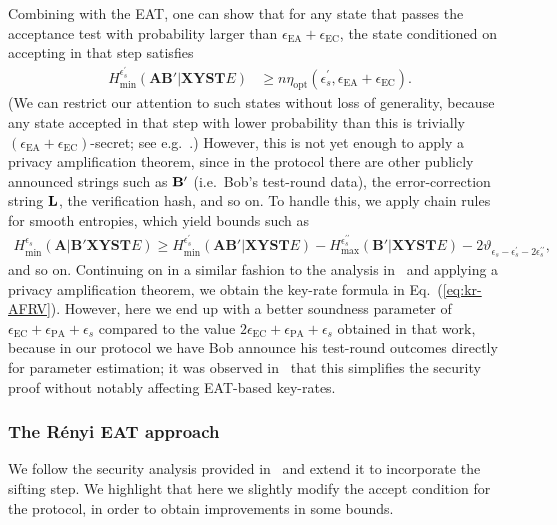 \documentclass[aps,reprint,showpacs,superscriptaddress]{revtex4-2}
\begin{document}
Combining with the EAT, one can show that for any state that passes the acceptance test with probability larger than $\epsilon_{\mathrm{EA}}+\epsilon_{\mathrm{EC}}$, the state conditioned on accepting in that step satisfies
\begin{align}
H_{\min}^{\epsilon_{s}^{\prime}}\left(\mathbf{AB}'|\mathbf{XYST}E\right) & \geqslant n\eta_{\mathrm{opt}}\left(\epsilon_{s}^{\prime},\epsilon_{\mathrm{EA}}+\epsilon_{\mathrm{EC}}\right).
\end{align}
(We can restrict our attention to such states without loss of generality, because any state accepted in that step with lower probability than this is trivially $(\epsilon_{\mathrm{EA}}+\epsilon_{\mathrm{EC}})$-secret; see e.g.~\cite{arnon2018practical,TSB+22}.)
However, this is not yet enough to apply a privacy amplification theorem, since in the protocol there are other publicly announced strings such as $\bf{B}'$ (i.e.~Bob's test-round data), the error-correction string $\bf{L}$, the verification hash, and so on. To handle this, we apply chain rules~\cite{vitanov2013} for smooth entropies, which yield bounds such as
\begin{align}
H_{\min}^{\epsilon_{s}}\left(\mathbf{A}|\mathbf{B}'\mathbf{XYST}E\right)
\geqslant
H_{\min}^{\epsilon_{s}^{\prime}}\left(\mathbf{AB}'|\mathbf{XYST}E\right) - H_{\max}^{\epsilon_{s}^{\prime\prime}}\left(\mathbf{B}'|\mathbf{XYST}E\right)
-2\vartheta_{\epsilon_{s}-\epsilon_{s}^{\prime}-2\epsilon_{s}^{\prime\prime}},
\end{align}
and so on. Continuing on in a similar fashion to the analysis in~\cite{TSB+22} and applying a privacy amplification theorem,
we obtain the key-rate formula in
Eq.~(\ref{eq:kr-AFRV}). However, here we end up with a better soundness parameter of $\epsilon_{\mathrm{EC}}+\epsilon_{\mathrm{PA}}+\epsilon_{s}$ compared to the value $2\epsilon_{\mathrm{EC}}+\epsilon_{\mathrm{PA}}+\epsilon_{s}$ obtained in that work, because in our protocol we have Bob announce his test-round outcomes directly for parameter estimation; it was observed in~\cite{arq2024generalized} that this simplifies the security proof without notably affecting EAT-based key-rates.


\subsubsection{The R\'{e}nyi EAT approach}
We follow the security analysis provided in~\cite{hahn2025analytic} and extend it to incorporate the sifting step. We highlight that here we slightly modify the
accept condition for the protocol, in order to obtain improvements in some bounds.
\end{document}
